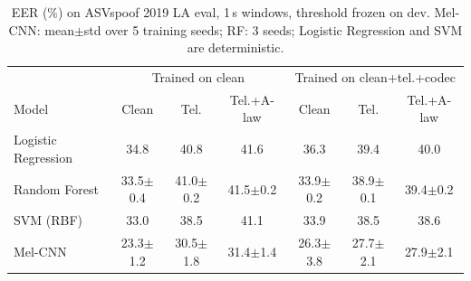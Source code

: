 \begin{table}[htbp]
\caption{EER (\%) on ASVspoof 2019 LA eval, 1\,s windows, threshold frozen on dev. Mel-CNN: mean$\pm$std over 5 training seeds; RF: 3 seeds; Logistic Regression and SVM are deterministic.}
\begin{center}
\footnotesize\setlength{\tabcolsep}{3pt}
\begin{tabular}{lcccccc}
\toprule
& \multicolumn{3}{c}{Trained on clean} & \multicolumn{3}{c}{Trained on clean+tel.+codec} \\
Model & Clean & Tel. & Tel.+A-law & Clean & Tel. & Tel.+A-law \\
\midrule
Logistic Regression & 34.8 & 40.8 & 41.6 & 36.3 & 39.4 & 40.0 \\
Random Forest & 33.5$\pm$0.4 & 41.0$\pm$0.2 & 41.5$\pm$0.2 & 33.9$\pm$0.2 & 38.9$\pm$0.1 & 39.4$\pm$0.2 \\
SVM (RBF) & 33.0 & 38.5 & 41.1 & 33.9 & 38.5 & 38.6 \\
Mel-CNN & 23.3$\pm$1.2 & 30.5$\pm$1.8 & 31.4$\pm$1.4 & 26.3$\pm$3.8 & 27.7$\pm$2.1 & 27.9$\pm$2.1 \\
\bottomrule
\end{tabular}
\label{tab:main}
\end{center}
\end{table}
